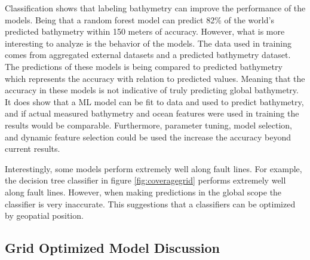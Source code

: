 \par
Classification shows that labeling bathymetry can improve the performance of the models.
Being that a random forest model can predict 82\% of the world's predicted bathymetry within 150 meters of accuracy. 
However, what is more interesting to analyze is the behavior of the models.
The data used in training comes from aggregated external datasets and a predicted bathymetry dataset.
The predictions of these models is being compared to predicted bathymetry which represents the accuracy with relation to predicted values.
Meaning that the accuracy in these models is not indicative of truly predicting global bathymetry.
It does show that a \ac{ML} model can be fit to data and used to predict bathymetry, and if actual measured bathymetry and ocean features were used in training the results would be comparable.
Furthermore, parameter tuning, model selection, and dynamic feature selection could be used the increase the accuracy beyond current results.

\par
Interestingly, some models perform extremely well along fault lines.
For example, the decision tree classifier in figure \ref{fig:coveragegrid} performs extremely well along fault lines.
However, when making predictions in the global scope the classifier is very inaccurate.
This suggestions that a classifiers can be optimized by geopatial position.



\subsection{Grid Optimized Model Discussion}


